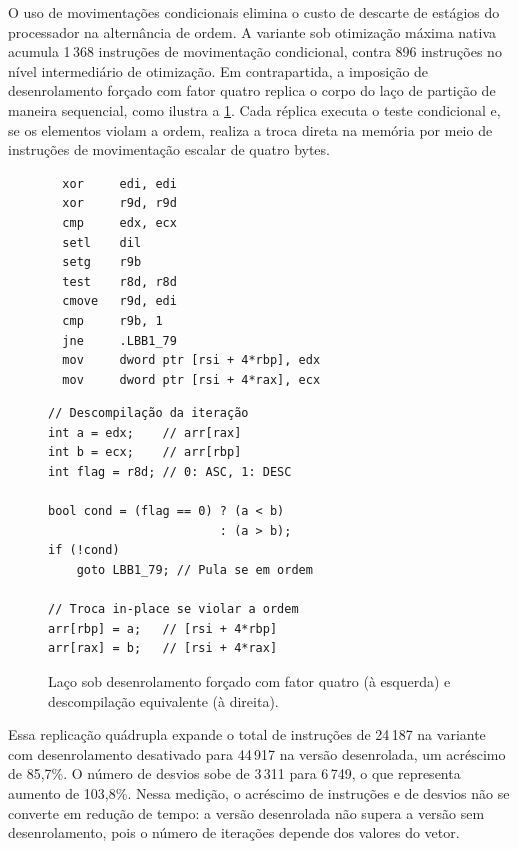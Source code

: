 \documentclass[12pt]{article}
\begin{document}
O uso de movimentações condicionais elimina o custo de descarte de estágios do processador na alternância de ordem. A variante sob otimização máxima nativa acumula 1\,368 instruções de movimentação condicional, contra 896 instruções no nível intermediário de otimização. Em contrapartida, a imposição de desenrolamento forçado com fator quatro replica o corpo do laço de partição de maneira sequencial, como ilustra a \cref{fig:asm-unroll}. Cada réplica executa o teste condicional e, se os elementos violam a ordem, realiza a troca direta na memória por meio de instruções de movimentação escalar de quatro bytes.

\begin{figure}[htbp]
\centering
\begin{minipage}[t]{0.48\textwidth}
\begin{verbatim}
  xor     edi, edi
  xor     r9d, r9d
  cmp     edx, ecx
  setl    dil
  setg    r9b
  test    r8d, r8d
  cmove   r9d, edi
  cmp     r9b, 1
  jne     .LBB1_79
  mov     dword ptr [rsi + 4*rbp], edx
  mov     dword ptr [rsi + 4*rax], ecx
\end{verbatim}
\end{minipage}\hfill
\begin{minipage}[t]{0.48\textwidth}
\begin{verbatim}
// Descompilação da iteração
int a = edx;    // arr[rax]
int b = ecx;    // arr[rbp]
int flag = r8d; // 0: ASC, 1: DESC

bool cond = (flag == 0) ? (a < b)
                        : (a > b);
if (!cond)
    goto LBB1_79; // Pula se em ordem

// Troca in-place se violar a ordem
arr[rbp] = a;   // [rsi + 4*rbp]
arr[rax] = b;   // [rsi + 4*rax]
\end{verbatim}
\end{minipage}
\caption{Laço sob desenrolamento forçado com fator quatro (à esquerda) e descompilação equivalente (à direita).}
\label{fig:asm-unroll}
\end{figure}

Essa replicação quádrupla expande o total de instruções de 24\,187 na variante com desenrolamento desativado para 44\,917 na versão desenrolada, um acréscimo de 85,7\%. O número de desvios sobe de 3\,311 para 6\,749, o que representa aumento de 103,8\%. Nessa medição, o acréscimo de instruções e de desvios não se converte em redução de tempo: a versão desenrolada não supera a versão sem desenrolamento, pois o número de iterações depende dos valores do vetor.
\end{document}
